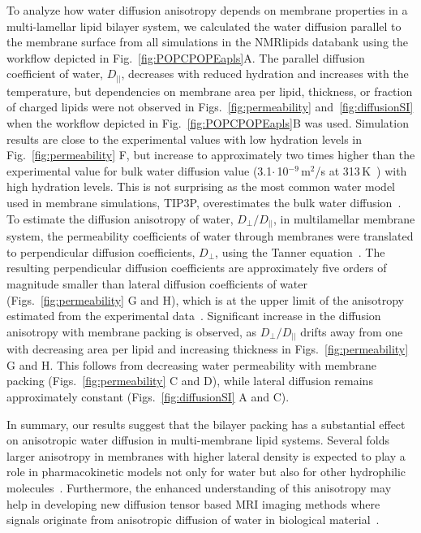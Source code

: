 \documentclass[fleqn,10pt]{wlscirep}
\begin{document}
To analyze how water diffusion anisotropy depends on membrane properties in a multi-lamellar lipid bilayer system, we calculated the water diffusion parallel to the membrane surface from all simulations in the NMRlipids databank using the workflow depicted in Fig.~\ref{fig:POPCPOPEapls}A. The parallel diffusion coefficient of water, $D_{||}$, decreases with reduced hydration and increases with the temperature, but dependencies on membrane area per lipid, thickness, or fraction of charged lipids were not observed in Figs.~\ref{fig:permeability} and~\ref{fig:diffusionSI} when the workflow depicted in Fig.~\ref{fig:POPCPOPEapls}B was used. Simulation results are close to the experimental values with low hydration levels in Fig.~\ref{fig:permeability} F, but increase to approximately two times higher than the experimental value for bulk water diffusion value (3.1$\cdot$\,10$^{-9}$\,m$^2$/s at 313\,K~\cite{khakimov08}) with high hydration levels. This is not surprising as the most common water model used in membrane simulations, TIP3P, overestimates the bulk water diffusion~\cite{pathirannahalage21}. To estimate the diffusion anisotropy of water, $D_\mathrm{\perp}/D_{||}$, in multilamellar membrane system, the permeability coefficients of water through membranes were translated to perpendicular diffusion coefficients, $D_\mathrm{\perp}$, using the Tanner equation~\cite{tanner78,wasterby02}. The resulting perpendicular diffusion coefficients are approximately five orders of magnitude smaller than lateral diffusion coefficients of water (Figs.~\ref{fig:permeability} G and H), which is at the upper limit of the anisotropy estimated from the experimental data~\cite{nitsche19}. 
Significant increase in the diffusion anisotropy with membrane packing is observed, as $D_\mathrm{\perp}/D_{||}$ drifts away from one with decreasing area per lipid and increasing thickness in Figs.~\ref{fig:permeability} G and H. This follows from decreasing water permeability with membrane packing (Figs.~\ref{fig:permeability} C and D), while lateral diffusion remains approximately constant (Figs.~\ref{fig:diffusionSI} A and C). 

In summary, our results suggest that the bilayer packing has a substantial effect on anisotropic water diffusion in multi-membrane lipid systems. Several folds larger anisotropy in membranes with higher lateral density is expected to play a role in pharmacokinetic models not only for water but also for other hydrophilic molecules~\cite{nitsche19}. Furthermore, the enhanced understanding of this anisotropy may help in developing new diffusion tensor based MRI imaging methods where signals originate from anisotropic diffusion of water in biological material~\cite{topgaard20}.
\end{document}

